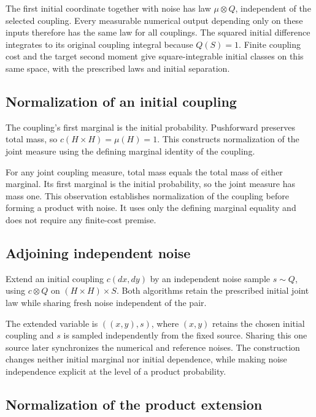 \documentclass[11pt,a4paper]{article}
\begin{document}
The first initial coordinate together with noise has law \(\mu\otimes Q\), independent of the selected coupling. Every measurable numerical output depending only on these inputs therefore has the same law for all couplings. The squared initial difference integrates to its original coupling integral because \(Q(S)=1\). Finite coupling cost and the target second moment give square-integrable initial classes on this same space, with the prescribed laws and initial separation.


\subsection{\texorpdfstring{Normalization of an initial coupling}{Normalization of an initial coupling}}


The coupling's first marginal is the initial probability. Pushforward preserves total mass, so \(c(H\times H)=\mu(H)=1\). This constructs normalization of the joint measure using the defining marginal identity of the coupling.



For any joint coupling measure, total mass equals the total mass of either marginal. Its first marginal is the initial probability, so the joint measure has mass one. This observation establishes normalization of the coupling before forming a product with noise. It uses only the defining marginal equality and does not require any finite-cost premise.


\subsection{\texorpdfstring{Adjoining independent noise}{Adjoining independent noise}}


Extend an initial coupling \(c(dx,dy)\) by an independent noise sample \(s\sim Q\), using \(c\otimes Q\) on \((H\times H)\times S\). Both algorithms retain the prescribed initial joint law while sharing fresh noise independent of the pair.



The extended variable is \(((x,y),s)\), where \((x,y)\) retains the chosen initial coupling and \(s\) is sampled independently from the fixed source. Sharing this one source later synchronizes the numerical and reference noises. The construction changes neither initial marginal nor initial dependence, while making noise independence explicit at the level of a product probability.


\subsection{\texorpdfstring{Normalization of the product extension}{Normalization of the product extension}}
\end{document}
